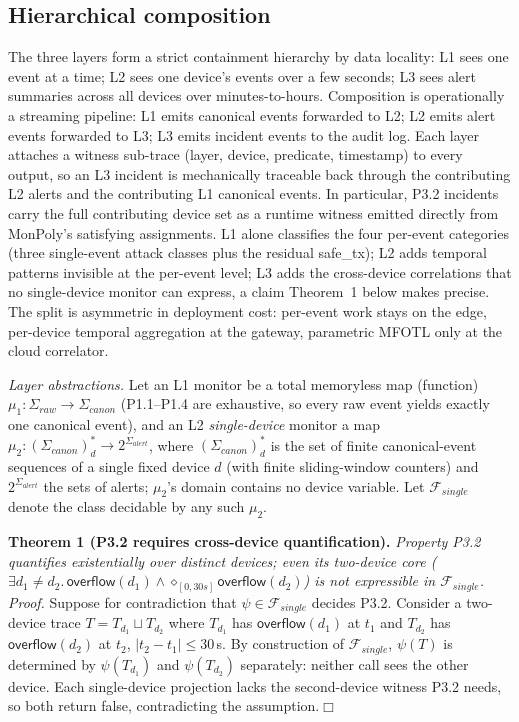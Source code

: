 \documentclass[runningheads]{llncs}
\begin{document}
\subsection{Hierarchical composition}
\label{sec:spec:compose}
The three layers form a strict containment hierarchy by data
locality: L1 sees one event at a time; L2 sees one device's
events over a few seconds; L3 sees alert summaries across all
devices over minutes-to-hours.  Composition is operationally a
streaming pipeline: L1 emits canonical events forwarded to L2;
L2 emits alert events forwarded to L3; L3 emits incident events
to the audit log.  Each layer attaches a witness sub-trace
(layer, device, predicate, timestamp) to every output, so an L3
incident is mechanically traceable back through the contributing
L2 alerts and the contributing L1 canonical events.
In particular, P3.2 incidents carry the full contributing device set as a runtime witness emitted directly from MonPoly's satisfying assignments.
  L1 alone
classifies the four per-event categories (three single-event attack
classes plus the residual \textsf{safe\_tx}); L2 adds temporal patterns
invisible at the per-event level; L3 adds the cross-device
correlations that no single-device monitor can express, a
claim Theorem~1 below makes precise.  The split is
asymmetric in deployment cost: per-event work stays on the edge,
per-device temporal aggregation at the gateway, parametric MFOTL
only at the cloud correlator.

\noindent\emph{Layer abstractions.}  Let an L1 monitor be a
total memoryless map (function) $\mu_1:\Sigma_{\mathit{raw}}\to
\Sigma_{\mathit{canon}}$ (P1.1--P1.4 are exhaustive, so every raw
event yields exactly one canonical event), and an L2
\emph{single-device} monitor a map
$\mu_2:(\Sigma_{\mathit{canon}})^{*}_d\to
2^{\Sigma_{\mathit{alert}}}$, where $(\Sigma_{\mathit{canon}})^{*}_d$
is the set of finite canonical-event sequences of a single fixed
device $d$ (with finite sliding-window counters) and
$2^{\Sigma_{\mathit{alert}}}$ the sets of alerts; $\mu_2$'s domain
contains no device variable.  Let
$\mathcal{F}_{\mathit{single}}$ denote the class decidable by any
such $\mu_2$.

\noindent\textbf{Theorem 1 (P3.2 requires cross-device
quantification).}\;
\emph{Property P3.2 quantifies existentially over distinct
devices; even its two-device core ($\exists d_1{\neq}d_2.\, \textsf{overflow}(d_1)
\wedge \diamond_{[0,30s]}\textsf{overflow}(d_2)$) is
not expressible in $\mathcal{F}_{\mathit{single}}$.}
\emph{Proof.}  Suppose for contradiction that
$\psi\in\mathcal{F}_{\mathit{single}}$ decides P3.2.  Consider a
two-device trace $T=T_{d_1}\sqcup T_{d_2}$ where $T_{d_1}$ has
$\textsf{overflow}(d_1)$ at $t_1$ and $T_{d_2}$ has
$\textsf{overflow}(d_2)$ at $t_2$, $|t_2{-}t_1|\leq 30$\,s.  By
construction of $\mathcal{F}_{\mathit{single}}$, $\psi(T)$ is
determined by $\psi(T_{d_1})$ and $\psi(T_{d_2})$ separately:
neither call sees the other device.  Each single-device
projection lacks the second-device witness P3.2 needs, so both
return \textsf{false}, contradicting the assumption.\hfill$\Box$
\end{document}
